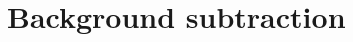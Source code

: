 \documentclass[../thesis.tex]{subfiles}
\begin{document}
\chapter{Background subtraction}
\label{chap:bkg}
\end{document}
